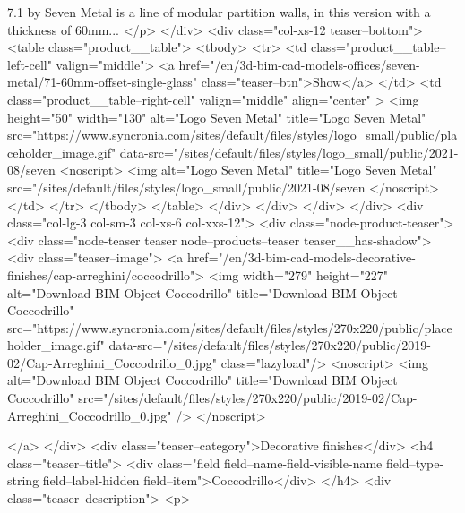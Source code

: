            7.1 by Seven Metal is a line of modular partition walls, in this version with a thickness of 60mm...
	</p>
	</div>
	<div class="col-xs-12 teaser--bottom">
		<table class="product__table">
            <tbody>
            	<tr>
                	<td class="product__table--left-cell" valign="middle"> 
                    	<a href="/en/3d-bim-cad-models-offices/seven-metal/71-60mm-offset-single-glass" class="teaser--btn">Show</a>
                	</td>
               		<td class="product__table--right-cell" valign="middle" align="center" >
                    	<img  height="50" width="130" alt="Logo Seven Metal" title="Logo Seven Metal" src="https://www.syncronia.com/sites/default/files/styles/logo_small/public/placeholder_image.gif" data-src="/sites/default/files/styles/logo_small/public/2021-08/seven%
            <noscript>
                <img alt="Logo Seven Metal" title="Logo Seven Metal" src="/sites/default/files/styles/logo_small/public/2021-08/seven%
            </noscript>
					</td>
           		</tr>
            </tbody>
        </table>
	</div>
</div>
          </div>
      </div>
            <div  class="col-lg-3 col-sm-3 col-xs-6 col-xxs-12">
          <div class="node-product-teaser">
          <div class="node-teaser teaser node--products--teaser teaser__has-shadow">
	<div class="teaser--image">
		<a href="/en/3d-bim-cad-models-decorative-finishes/cap-arreghini/coccodrillo">
			<img width="279" height="227" alt="Download BIM Object Coccodrillo" title="Download BIM Object Coccodrillo" src="https://www.syncronia.com/sites/default/files/styles/270x220/public/placeholder_image.gif" data-src="/sites/default/files/styles/270x220/public/2019-02/Cap-Arreghini_Coccodrillo_0.jpg" class="lazyload"/>
            <noscript>
                <img alt="Download BIM Object Coccodrillo" title="Download BIM Object Coccodrillo" src="/sites/default/files/styles/270x220/public/2019-02/Cap-Arreghini_Coccodrillo_0.jpg" />
            </noscript>
			
		</a> 
	</div>
	<div class="teaser--category">Decorative finishes</div>
	<h4 class="teaser--title">
            <div class="field field--name-field-visible-name field--type-string field--label-hidden field--item">Coccodrillo</div>
      </h4>
	<div  class="teaser--description">
	<p>
				
